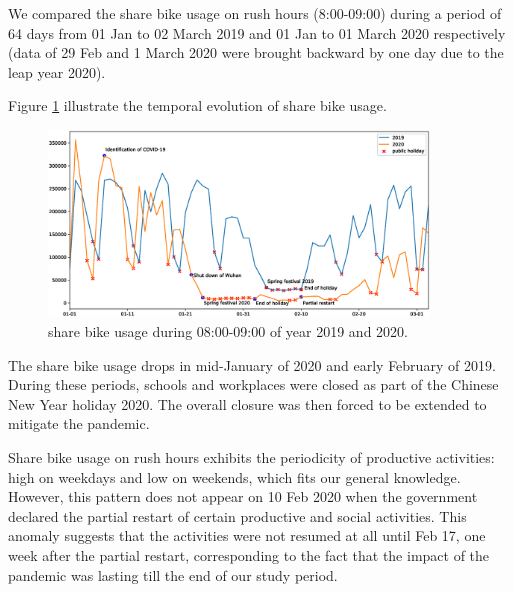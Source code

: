 \documentclass[preprints,ijgi,submit,moreauthors]{Definitions/mdpi}
\begin{document}
We compared the share bike usage on rush hours (8:00-09:00) during a period of 64 days from 01 Jan to 02 March 2019 and 01 Jan to 01 March 2020 respectively (data of 29 Feb and 1 March 2020 were brought backward by one day due to the leap year 2020).


Figure \ref{fig:hour_comparison_8} %
 illustrate the temporal evolution of share bike usage.

\begin{figure}[ht]
    \centering
    \includegraphics[width=0.9\textwidth]{Figures/hour_8.eps}
    \caption{share bike usage during 08:00-09:00 of year 2019 and 2020.}
    \label{fig:hour_comparison_8}
\end{figure}

The share bike usage drops in mid-January of 2020 and early February of 2019.
During these periods, schools and workplaces were closed as part of the Chinese New Year holiday 2020.
The overall closure was then forced to be extended to mitigate the pandemic.

Share bike usage on rush hours exhibits the periodicity of productive activities: high on weekdays and low on weekends, which fits our general knowledge.
However, this pattern does not appear on 10 Feb 2020 when the government declared the partial restart of certain productive and social activities.
This anomaly suggests that the activities were not resumed at all until Feb 17, one week after the partial restart, corresponding to the fact that the impact of the pandemic was lasting till the end of our study period.
\end{document}
